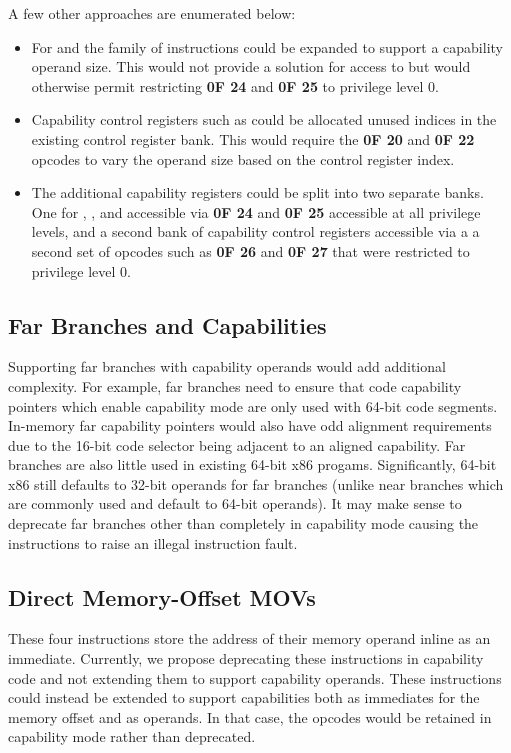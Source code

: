 A few other approaches are enumerated below:

\begin{itemize}
  \item For \CFS{} and \CGS{} the  family of
    instructions could be expanded to support a capability operand
    size.  This would not provide a solution for access to \DDC{} but
    would otherwise permit restricting \textbf{0F 24} and \textbf{0F
      25} to privilege level 0.

  \item Capability control registers such as \KGS{} could be allocated
    unused indices in the existing control register bank.  This would
    require the \textbf{0F 20} and \textbf{0F 22} opcodes to vary the
    operand size based on the control register index.

  \item The additional capability registers could be split into two
    separate banks.  One for \CFS{}, \CGS{}, and \DDC{} accessible via
    \textbf{0F 24} and \textbf{0F 25} accessible at all privilege
    levels, and a second bank of capability control registers
    accessible via a a second set of opcodes such as \textbf{0F 26}
    and \textbf{0F 27} that were restricted to privilege level 0.
\end{itemize}

\subsection{Far Branches and Capabilities}

Supporting far branches with capability operands would add additional
complexity.  For example, far branches need to ensure that code
capability pointers which enable capability mode are only used with
64-bit code segments.  In-memory far capability pointers would also
have odd alignment requirements due to the 16-bit code selector being
adjacent to an aligned capability.  Far branches are also little used
in existing 64-bit x86 progams.  Significantly, 64-bit x86 still
defaults to 32-bit operands for far branches (unlike near branches
which are commonly used and default to 64-bit operands).  It may make
sense to deprecate far branches other than  completely
in capability mode causing the instructions to raise an illegal
instruction fault.

\subsection{Direct Memory-Offset MOVs}

These four  instructions store the address of their
memory operand inline as an immediate.  Currently, we propose
deprecating these instructions in capability code and not extending
them to support capability operands.  These instructions could instead
be extended to support capabilities both as immediates for the memory
offset and as operands.  In that case, the opcodes would be retained
in capability mode rather than deprecated.
